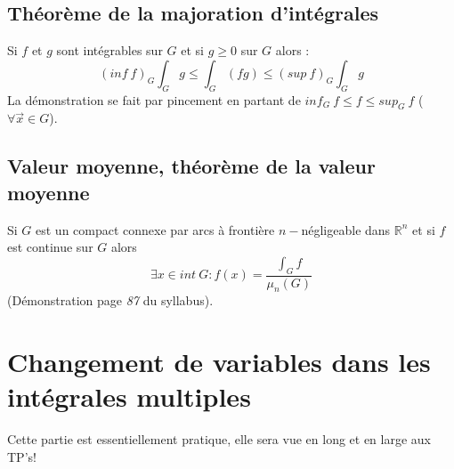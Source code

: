 \documentclass[11pt, a4paper, openany]{book}
\begin{document}
\subsection{Théorème de la majoration d'intégrales}
Si $f$ et $g$ sont intégrables sur $G$ et si $g \geq 0$ sur $G$ alors : 
$$(inf\ f)_G \int_G g \leq \int_G (fg) \leq (sup\ f)_G \int_G g$$
La démonstration se fait par pincement en partant de $inf_G\ f \leq f \leq sup_G\ f$ ($\forall \vec{x} \in G$).

\subsection{Valeur moyenne, théorème de la valeur moyenne}
Si $G$ est un compact connexe par arcs à frontière $n-$négligeable dans $\mathbb{R}^n$ et si $f$ est continue sur $G$ alors 
$$\exists x \in int\ G : f(x) = \frac{\int_G f}{\mu_n(G)}$$
(Démonstration page \textit{87} du syllabus).


\section{Changement de variables dans les intégrales multiples}
Cette partie est essentiellement pratique, elle sera vue en long et en large aux TP's! 




\appendix
%
\end{document}
